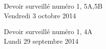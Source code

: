 \documentclass[a4paper,10pt]{article}
\begin{document}
\begin{feuilleDS}{Devoir surveillé numéro 1, 5A,5B\\ \small Vendredi 3 octobre 2014}
\end{feuilleDS}



\begin{feuilleDS}{Devoir surveillé numéro 1, 4A\\ \small Lundi 29 septembre 2014}

\end{feuilleDS}
\end{document}
